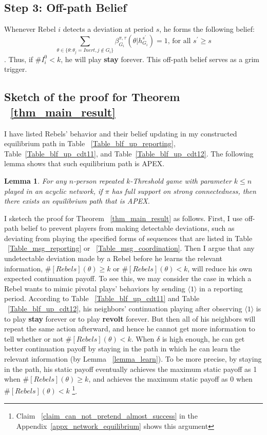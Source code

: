 \documentclass[12pt,letter]{article}
\newtheorem{lemma}{Lemma}[section]
\theoremstyle{definition}
\theoremstyle{remark}
\theoremstyle{claim}
\begin{document}
\subsection{Step 3: Off-path Belief}

Whenever Rebel $i$ detects a deviation at period $s$, he forms the following belief: 
\begin{equation}
\label{eq_grim_trigger}
\sum_{\theta \in \{\theta:\theta_j=Inert,j\notin G_i\}}\beta^{\pi,\tau}_{G_i}({\theta}|h^{s^{'}}_{G_i})=1 \text{, for all $s^{'}\geq s$}
\end{equation}
. Thus, if $\# I^0_i<k$, he will play \textbf{stay} forever. This off-path belief serves as a grim trigger. 



\subsection{Sketch of the proof for Theorem ~\ref{thm_main_result}}

I have listed Rebels' behavior and their belief updating in my constructed equilibrium path in Table ~\ref{Table_blf_up_reporting}, Table~\ref{Table_blf_up_cdt11}, and Table~\ref{Table_blf_up_cdt12}. The following lemma shows that such equilibrium path is APEX.
\begin{lemma}\label{lemma_in_the_path}
For any $n$-person repeated $k$-Threshold game with parameter $k\leq n$ played in an acyclic network, if $\pi$ has full support on strong connectedness, then there exists an equilibrium path that is APEX.
\end{lemma}

I sketech the proof for Theorem ~\ref{thm_main_result} as follows. First, I use off-path belief to prevent players from making detectable deviations, such as deviating from playing the specified forms of sequences that are listed in Table ~\ref{Table_msg_reporting} or ~\ref{Table_msg_coordination}. Then I argue that any undetectable deviation made by a Rebel before he learns the relevant information, $\#[Rebels](\theta)\geq k$ or $\#[Rebels](\theta)< k$, will reduce his own expected continuation payoff.  To see this, we may consider the case in which a Rebel wants to mimic pivotal plays' behaviors by sending $\langle 1 \rangle$ in a reporting period. According to Table ~\ref{Table_blf_up_cdt11} and Table ~\ref{Table_blf_up_cdt12}, his neighbors' continuation playing after observing $\langle 1 \rangle$ is to play \textbf{stay} forever or to play \textbf{revolt} forever. But then all of his neighbors will repeat the same action afterward, and hence he cannot get more information to tell whether or not $\#[Rebels](\theta)< k$. When $\delta$ is high enough,  he can get better continuation payoff by staying in the path in which he can learn the relevant information (by Lemma ~\ref{lemma_learn}). To be more precise, by staying in the path, his static payoff eventually achieves the maximum static payoff as 1 when $\#[Rebels](\theta)\geq k$, and achieves the maximum static payoff as 0 when $\#[Rebels](\theta)< k$ \footnote{Claim ~\ref{claim_can_not_pretend_almost_success} in the Appendix~\ref{appx_network_equilibrium} shows this argument}.
\end{document}

